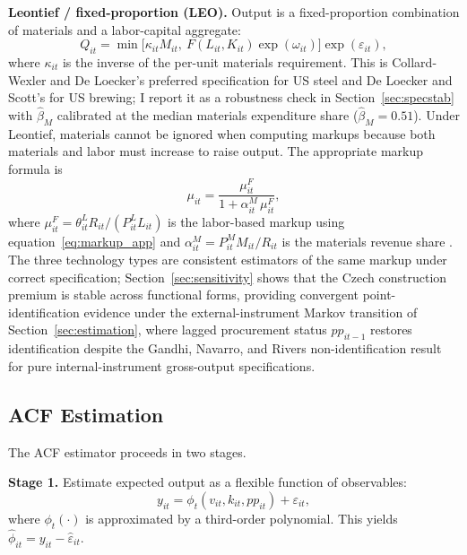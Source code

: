 \documentclass[11pt]{article}
\begin{document}
\textbf{Leontief / fixed-proportion (LEO).} Output is a fixed-proportion combination of materials and a labor-capital aggregate:
\begin{equation}\label{eq:leo_tech}
    Q_{it} = \min\bigl[\kappa_{it} M_{it},\ F(L_{it}, K_{it}) \exp(\omega_{it})\bigr] \exp(\varepsilon_{it}),
\end{equation}
where $\kappa_{it}$ is the inverse of the per-unit materials requirement. This is Collard-Wexler and De Loecker's \cite{CWDL2015} preferred specification for US steel and De Loecker and Scott's \cite{DeLoeckerScott2025} for US brewing; I report it as a robustness check in Section~\ref{sec:specstab} with $\hat\beta_M$ calibrated at the median materials expenditure share ($\hat\beta_M = 0.51$). Under Leontief, materials cannot be ignored when computing markups because both materials and labor must increase to raise output. The appropriate markup formula is
\begin{equation}\label{eq:leo_markup}
    \mu_{it} = \frac{\mu^F_{it}}{1 + \alpha^M_{it}\,\mu^F_{it}},
\end{equation}
where $\mu^F_{it} = \theta^L_{it} R_{it} / (P^L_{it} L_{it})$ is the labor-based markup using equation~\eqref{eq:markup_app} and $\alpha^M_{it} = P^M_{it} M_{it}/R_{it}$ is the materials revenue share \cite{DeLoeckerScott2025}. The three technology types are consistent estimators of the same markup under correct specification; Section~\ref{sec:sensitivity} shows that the Czech construction premium is stable across functional forms, providing convergent point-identification evidence under the external-instrument Markov transition of Section~\ref{sec:estimation}, where lagged procurement status $pp_{it-1}$ restores identification despite the Gandhi, Navarro, and Rivers \cite{GNR2020} non-identification result for pure internal-instrument gross-output specifications.

\subsection{ACF Estimation}\label{app:acf}

The ACF estimator proceeds in two stages.

\textbf{Stage 1.} Estimate expected output as a flexible function of observables:
\begin{equation}
    y_{it} = \phi_t(v_{it}, k_{it}, pp_{it}) + \varepsilon_{it},
\end{equation}
where $\phi_t(\cdot)$ is approximated by a third-order polynomial. This yields $\hat{\phi}_{it} = y_{it} - \hat{\varepsilon}_{it}$.
\end{document}
